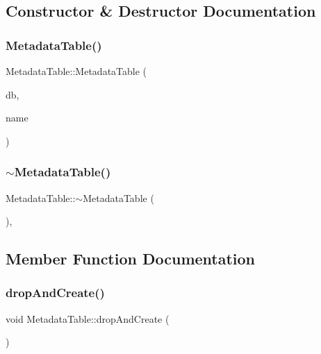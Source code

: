 \subsection{Constructor \& Destructor Documentation}
\mbox{\label{class_metadata_table_acc68db664abecdb1ec38adb6d3734a7a}} 
\subsubsection{\texorpdfstring{MetadataTable()}{MetadataTable()}}
{\footnotesize\ttfamily Metadata\+Table\+::\+Metadata\+Table (\begin{DoxyParamCaption}\item[{std\+::shared\+\_\+ptr$<$ S\+Q\+Lite\+Storage $>$}]{db,  }\item[{std\+::string}]{name }\end{DoxyParamCaption})}

\mbox{\label{class_metadata_table_ac03028aadb5b6886f708e569aabd1fac}} 
\subsubsection{\texorpdfstring{$\sim$MetadataTable()}{~MetadataTable()}}
{\footnotesize\ttfamily Metadata\+Table\+::$\sim$\+Metadata\+Table (\begin{DoxyParamCaption}{ }\end{DoxyParamCaption})\hspace{0.3cm}{\ttfamily [default]}, {\ttfamily [noexcept]}}



\subsection{Member Function Documentation}
\mbox{\label{class_metadata_table_acb0409849ccd65c5c05f3933c84b1ec2}} 
\subsubsection{\texorpdfstring{dropAndCreate()}{dropAndCreate()}}
{\footnotesize\ttfamily void Metadata\+Table\+::drop\+And\+Create (\begin{DoxyParamCaption}{ }\end{DoxyParamCaption})}

